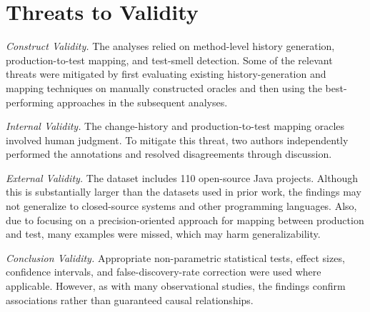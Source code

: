 \section{Threats to Validity}


\emph{Construct Validity.} The analyses relied on method-level history generation, production-to-test mapping, and test-smell detection. Some of the relevant threats were mitigated by first evaluating existing history-generation and mapping techniques on manually constructed oracles and then using the best-performing approaches in the subsequent analyses.

\emph{Internal Validity.} The change-history and production-to-test mapping oracles involved human judgment. To mitigate this threat, two authors independently performed the annotations and resolved disagreements through discussion.

\emph{External Validity.} The dataset includes 110 open-source Java projects. Although this is substantially larger than the datasets used in prior work, the findings may not generalize to closed-source systems and other programming languages. Also, due to focusing on a precision-oriented approach for mapping between production and test, many examples were missed, which may harm generalizability.

\emph{Conclusion Validity.} Appropriate non-parametric statistical tests, effect sizes, confidence intervals, and false-discovery-rate correction were used where applicable. However, as with many observational studies, the findings confirm associations rather than guaranteed causal relationships.
